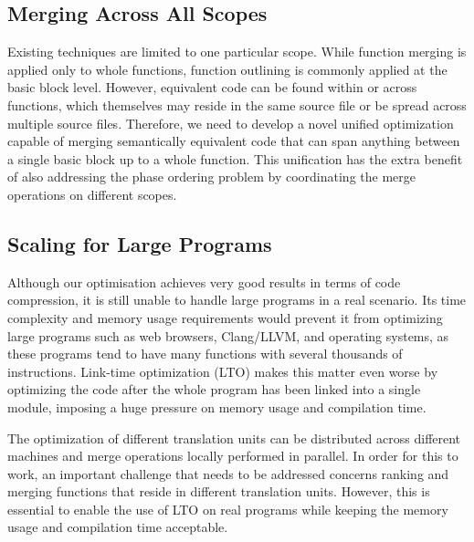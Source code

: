 \subsection{Merging Across All Scopes}

Existing techniques are limited to one particular scope.
While function merging is applied only to whole functions,
function outlining is commonly applied at the basic block level.
However, equivalent code can be found within or across functions, which themselves may reside in the same source file or be spread across multiple source files.
Therefore, we need to develop a novel unified optimization capable of merging semantically equivalent code that can span anything between a single basic block up to a whole function.
This unification has the extra benefit of also addressing the phase ordering problem by coordinating the merge operations on different scopes.

\subsection{Scaling for Large Programs}

Although our optimisation achieves very good results in terms of code compression, it is still unable to handle large programs in a real scenario.
Its time complexity and memory usage requirements would prevent it from optimizing large programs such as web browsers, Clang/LLVM, and operating systems, as these programs tend to have many functions with several thousands of instructions.
Link-time optimization (LTO) makes this matter even worse by optimizing the code after the whole program has been linked into a single module, imposing a huge pressure on memory usage and compilation time.

The optimization of different translation units can be distributed across different machines and merge operations locally performed in parallel.
In order for this to work, an important challenge that needs to be addressed concerns ranking and merging functions that reside in different translation units.
However, this is essential to enable the use of LTO on real programs while keeping the memory usage and compilation time acceptable.

